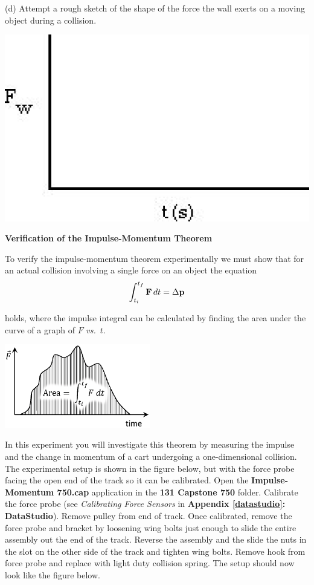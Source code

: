 (d) Attempt a rough sketch of the shape of the force the wall exerts on a moving
object during a collision.

\vspace{0.3cm}
{\par\centering \includegraphics{impulse/impulse_fig2.eps} \par}
\vspace{0.3cm}

\textbf{Verification of the Impulse-Momentum Theorem} 

To verify the impulse-momentum theorem experimentally we must show that for
an actual collision involving a single force on an object the equation
\[
\int_{t_{i}}^{t_{f}}{\bf F}\,dt=\Delta {\bf p}\]


holds, where the impulse integral can be calculated by finding the area under
the curve of a graph of $F$ \textit{vs.}~$t$.

{\par\centering \includegraphics[width=2.5in]{impulse/impulse_fig3_new.eps} \par}

In this experiment you will investigate this theorem by measuring the impulse
and the change in momentum of a cart undergoing a one-dimensional collision.
The experimental setup is shown in the figure below, but with the force probe 
facing the open end of the track so it can be calibrated.  Open the \textbf{Impulse-Momentum 750.cap} application in the \textbf{131 Capstone 750} folder. Calibrate the force probe 
(see \textit{Calibrating Force Sensors} in \textbf{Appendix \ref{datastudio}: DataStudio}). 
Remove pulley from end of track. Once calibrated, remove the force probe and 
bracket by loosening wing bolts just enough to slide the entire assembly out the 
end of the track. Reverse the assembly and the slide the nuts in the slot on the 
other side of the track and tighten wing bolts. Remove hook from force probe and 
replace with light duty collision spring. The setup should now look like the figure 
below.


